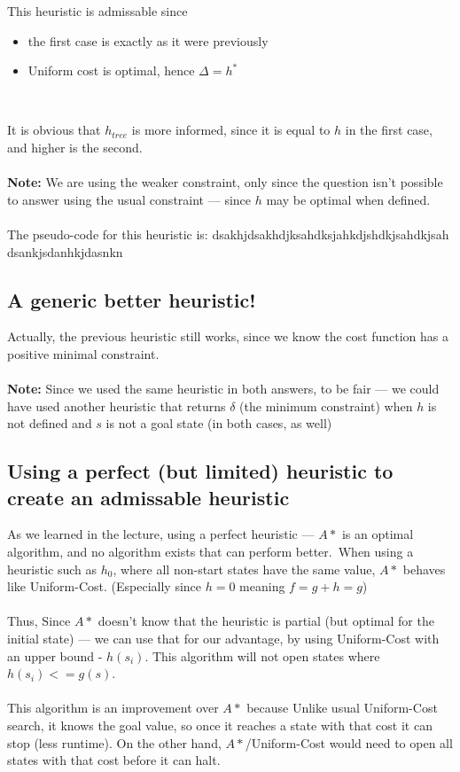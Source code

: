 \documentclass{article}
\begin{document}
This heuristic is admissable since
\begin{itemize}
\item the first case is exactly as it were previously
\item Uniform cost is optimal, hence $\Delta = h^* $
\end{itemize}
\ 

It is obvious that $h_{tree}$ is more informed, since it is equal to $h$ in the first case, and higher is the second.
\\~\\
\textbf{Note: } We are using the weaker constraint, only since the question isn't possible to answer using the usual constraint --- since $h$ may be optimal when defined.
\\~\\

The pseudo-code for this heuristic is:
dsakhjdsakhdjksahdksjahkdjshdkjsahdkjsah dsankjsdanhkjdasnkn

\subsection*{A generic better heuristic!}
Actually, the previous heuristic still works, since we know the cost function has a positive minimal constraint.
\\~\\
\textbf{Note: } Since we used the same heuristic in both answers, to be fair --- we could have used another heuristic that returns $\delta$ (the minimum constraint) when $h$ is not defined and $s$ is not a goal state (in both cases, as well)

\subsection*{Using a perfect (but limited) heuristic to create an admissable heuristic}
As we learned in the lecture, using a perfect heuristic --- $A*$ is an optimal algorithm, and no algorithm exists that can perform better.\ 
When using a heuristic such as $h_0$, where all non-start states have the same value, $A*$ behaves like Uniform-Cost. (Especially since $h=0$ meaning $f=g+h=g$)
\\~\\
Thus, Since $A*$ doesn't know that the heuristic is partial (but optimal for the initial state) --- we can use that for our advantage, by using Uniform-Cost with an upper bound - $h(s_i)$. This algorithm will not open states where $h(s_i) <= g(s)$.
\\~\\
This algorithm is an improvement over $A*$ because Unlike usual Uniform-Cost search, it knows the goal value, so once it reaches a state with that cost it can stop (less runtime). On the other hand, $A*$/Uniform-Cost would need to open all states with that cost before it can halt.
\end{document}
